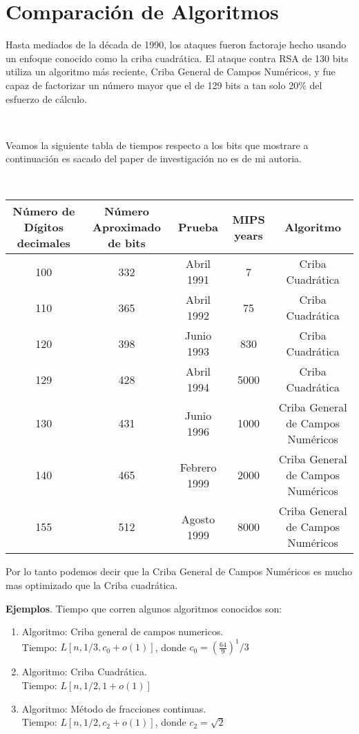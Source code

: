 \documentclass[11pt, conference]{IEEEtran}
\begin{document}
\section{Comparación de Algoritmos}
Hasta mediados de la década de 1990, los ataques fueron factoraje hecho usando un enfoque conocido como la criba cuadrática. El ataque contra RSA de 130 bits utiliza un algoritmo más reciente, Criba General de Campos Numéricos, y fue capaz de factorizar un número mayor que el de 129 bits a tan solo 20\% del esfuerzo de cálculo.

\

Veamos la siguiente tabla de tiempos respecto a los bits que mostrare a continuación es sacado del paper de investigación no es de mi autoria.
\cite{h}

\

\begin{table}[htb]
	\begin{center}
		\begin{tabular}{|c|c|c|c|c|}
			\hline
			Número de Dígitos decimales & Número Aproximado de bits  & Prueba & MIPS years & Algoritmo\\
			\hline
			100&332&Abril 1991&7& Criba Cuadrática\\
			\hline
			110&365&Abril 1992&75&Criba Cuadrática\\
			\hline
			120&398&Junio 1993&830&Criba Cuadrática\\
			\hline
			129&428&Abril 1994&5000&Criba Cuadrática\\
			\hline
			130&431&Junio 1996&1000&Criba General de Campos Numéricos\\
			\hline
			140&465&Febrero 1999&2000&Criba General de Campos Numéricos\\
			\hline
			155&512&Agosto 1999&8000&Criba General de Campos Numéricos\\
			\hline
		\end{tabular}
	\end{center}
\end{table}

Por lo tanto podemos decir que la Criba General de Campos Numéricos es mucho mas optimizado que la Criba cuadrática. 

\textbf{Ejemplos}. Tiempo que corren algunos algoritmos conocidos son: 
\begin{enumerate}
	\item Algoritmo: Criba general de campos numericos.\\
	Tiempo: $L[n,1/3,c_0+o(1)]$, donde $c_0=(\frac{64}{9})^1/3$
	\item Algoritmo: Criba Cuadrática.\\
	Tiempo: $L[n,1/2,1+o(1)]$
	\item Algoritmo: Método de fracciones continuas.\\
	Tiempo: $L[n,1/2,c_2+o(1)]$, donde $c_2=\sqrt{2}$
\end{enumerate}
\end{document}
